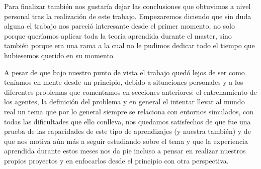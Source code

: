 Para finalizar también nos gustaría dejar las conclusiones que obtuvimos a nivel personal tras la realización de este trabajo. Empezaremos diciendo que sin duda alguna el trabajo nos pareció interesante desde el primer momento, no solo porque queríamos aplicar toda la teoría aprendida durante el master, sino también porque era una rama a la cual no le pudimos dedicar todo el tiempo que hubiesemos querido en su momento. 
\medskip

A pesar de que bajo nuestro punto de vista el trabajo quedó lejos de ser como teníamos en mente desde un principio, debido a situaciones personales y a los diferentes problemas que comentamos en secciones anteriores: el entrenamiento de los agentes, la definición del problema y en general el intentar llevar al mundo real un tema que por lo general siempre se relaciona con entornos simulados, con todas las dificultades que ello conlleva, nos quedamos satisfechos de que fue una prueba de las capacidades de este tipo de aprendizajes (y nuestra también) y de que nos motiva aún más a seguir estudiando sobre el tema y que la experiencia aprendida durante estos meses nos da pie incluso a pensar en realizar nuestros propios proyectos y en enfocarlos desde el principio con otra perspectiva.
